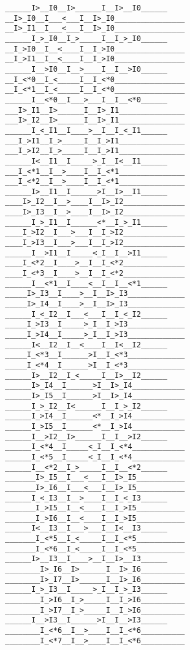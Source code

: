 \documentclass[pre,preprint,showpacs,showkeys,amsfonts]{revtex4}
\begin{document}
\begin{figure}
{\begin{verbatim}
______I>__I0__I>______I__I>__I0______   __I>_I0__I___<___I__I>_I0________________   __I>_I1__I___<___I__I>_I0________________
______I_>_I0__I_>_____I__I_>_I0______   __I_>I0__I__<____I__I_>I0________________   __I_>I1__I__<____I__I_>I0________________
______I__>I0__I__>____I__I__>I0______   __I_<*0__I_<_____I__I_<*0________________   __I_<*1__I_<_____I__I_<*0________________
______I__<*0__I___>___I__I__<*0______   ___I>_I1__I>______I__I>_I1_______________   ___I>_I2__I>______I__I>_I1_______________
______I_<_I1__I____>__I__I_<_I1______   ___I_>I1__I_>_____I__I_>I1_______________   ___I_>I2__I_>_____I__I_>I1_______________
______I<__I1__I_____>_I__I<__I1______   ___I_<*1__I__>____I__I_<*1_______________   ___I_<*2__I__>____I__I_<*1_______________
______I>__I1__I______>I__I>__I1______   ____I>_I2__I__>____I__I>_I2______________   ____I>_I3__I__>____I__I>_I2______________
______I_>_I1__I______<*__I_>_I1______   ____I_>I2__I___>___I__I_>I2______________   ____I_>I3__I___>___I__I_>I2______________
______I__>I1__I_____<_I__I__>I1______   ____I_<*2__I____>__I__I_<*2______________   ____I_<*3__I____>__I__I_<*2______________
______I__<*1__I____<__I__I__<*1______   _____I>_I3__I____>__I__I>_I3_____________   _____I>_I4__I____>__I__I>_I3_____________
______I_<_I2__I___<___I__I_<_I2______   _____I_>I3__I_____>_I__I_>I3_____________   _____I_>I4__I_____>_I__I_>I3_____________
______I<__I2__I__<____I__I<__I2______   _____I_<*3__I______>I__I_<*3_____________   _____I_<*4__I______>I__I_<*3_____________
______I>__I2__I_<_____I__I>__I2______   ______I>_I4__I______>I__I>_I4____________   ______I>_I5__I______>I__I>_I4____________
______I_>_I2__I<______I__I_>_I2______   ______I_>I4__I______<*__I_>I4____________   ______I_>I5__I______<*__I_>I4____________
______I__>I2__I>______I__I__>I2______   ______I_<*4__I_____<_I__I_<*4____________   ______I_<*5__I_____<_I__I_<*4____________
______I__<*2__I_>_____I__I__<*2______   _______I>_I5__I___<___I__I>_I5___________   _______I>_I6__I___<___I__I>_I5___________
______I_<_I3__I__>____I__I_<_I3______   _______I_>I5__I__<____I__I_>I5___________   _______I_>I6__I__<____I__I_>I5___________
______I<__I3__I___>___I__I<__I3______   _______I_<*5__I_<_____I__I_<*5___________   _______I_<*6__I_<_____I__I_<*5___________
______I>__I3__I____>__I__I>__I3______   ________I>_I6__I>______I__I>_I6__________   ________I>_I7__I>______I__I>_I6__________
______I_>_I3__I_____>_I__I_>_I3______   ________I_>I6__I_>_____I__I_>I6__________   ________I_>I7__I_>_____I__I_>I6__________
______I__>I3__I______>I__I__>I3______   ________I_<*6__I__>____I__I_<*6__________   ________I_<*7__I__>____I__I_<*6__________

\end{verbatim}}
\end{figure}
\end{document}
